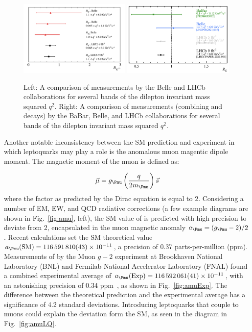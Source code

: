 \begin{figure}[H]
    \centering
    \includegraphics[width=0.49\textwidth]{Images/Theory/LHCbBelle.png}
    \includegraphics[width=0.49\textwidth]{Images/Theory/RKmeasurements.png}
    \caption{Left: A comparison of \Ratio{\PKstar} measurements by the Belle and LHCb collaborations for several bands of the dilepton invariant mass squared $q^2$. Right: A comparison of \Ratio{\PK} measurements (combining \HepProcess{\PBplus \to \PKplus\Pleptonplus\Pleptonminus} and \HepProcess{\PBzero \to \PKzero\Pleptonplus\Pleptonminus} decays) by the BaBar, Belle, and LHCb collaborations for several bands of the dilepton invariant mass squared $q^2$.}
    \label{fig:FlavorAnomalies}
\end{figure}


Another notable inconsistency between the SM prediction and experiment in which leptoquarks may play a role is the anomalous muon magentic dipole moment. The magnetic moment of the muon is defined as:

\begin{equation}
    \vec{\mu} = \gmuon\left(\frac{q}{2m_{\Pmu}}\right)\vec{s}
\end{equation}
where the factor \gmuon as predicted by the Dirac equation is equal to 2. Considering a number of EM, EW, and QCD radiative corrections (a few example diagrams are shown in Fig.~\ref{fig:amu}, left), the SM value of \gmuon is predicted with high precision to deviate from 2, encapsulated in the muon magnetic anomaly $\amuon = (\gmuon-2)/2$. Recent calculations set the SM theoretical value $\amuon(\mathrm{SM})=\num{116591810(43)e-11}$, a precision of 0.37 parts-per-million (ppm). Measurements of \amuon by the Muon $g-2$ experiment at Brookhaven National Laboratory (BNL) and Fermilab National Accelerator Laboratory (FNAL) found a combined experimental average of $\amuon(\mathrm{Exp}) = \num{116592061(41)e-11}$, with an astonishing precision of 0.34 ppm~\cite{Muongminus2}, as shown in Fig.~\ref{fig:amuExp}. The difference between the theoretical prediction and the experimental average has a significance of 4.2 standard deviations. Introducing leptoquarks that couple to muons could explain the deviation form the SM, as seen in the diagram in Fig.~\ref{fig:amuLQ}.


